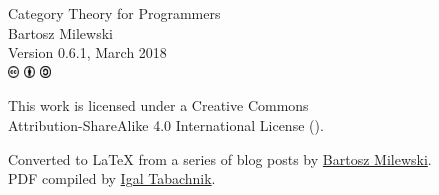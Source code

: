 \vspace*{\fill}
\thispagestyle{empty}

\begin{small}
\begin{center}

\noindent
Category Theory for Programmers\\

\vspace{1.0em}
\noindent
Bartosz Milewski\\

\vspace{1.26em}
\noindent
Version 0.6.1, March 2018\\

\vspace{1.6em}
\noindent
\includegraphics[width=3mm]{fig/icons/cc.pdf}
\includegraphics[width=3mm]{fig/icons/by.pdf}
\includegraphics[width=3mm]{fig/icons/sa.pdf}

\vspace{0.4em}
\noindent
This work is licensed under a Creative Commons\\
Attribution-ShareAlike 4.0 International License
(\href{http://creativecommons.org/licenses/by-sa/4.0/}{}).

\vspace{1.26em}
\noindent
Converted to \LaTeX{} from a series of blog posts by \href{https://bartoszmilewski.com/2014/10/28/category-theory-for-programmers-the-preface/}{Bartosz Milewski}.\\
PDF compiled by \href{https://github.com/hmemcpy/milewski-ctfp-pdf}{Igal Tabachnik}.\\

\end{center}
\end{small}